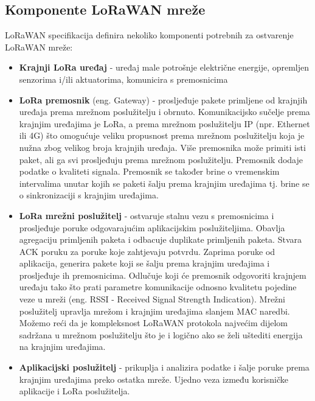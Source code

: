 \subsection{Komponente LoRaWAN mreže}
\label{subsection:lorawan_components}
LoRaWAN specifikacija definira nekoliko komponenti potrebnih za ostvarenje LoRaWAN mreže:
\begin{itemize}
\item \textbf{Krajnji LoRa uređaj} - uređaj male potrošnje električne energije, opremljen senzorima i/ili aktuatorima, komunicira s premosnicima

\item \textbf{LoRa premosnik} (eng. Gateway) - prosljeđuje pakete primljene od krajnjih uređaja prema mrežnom poslužitelju i obrnuto. Komunikacijsko sučelje prema krajnjim uređajima je LoRa, a prema mrežnom poslužitelju IP (npr. Ethernet ili 4G) što omogućuje veliku propusnost prema mrežnom poslužitelju koja je nužna zbog velikog broja krajnjih uređaja. Više premosnika može primiti isti paket, ali ga svi prosljeđuju prema mrežnom poslužitelju. Premosnik dodaje podatke o kvaliteti signala. Premosnik se također brine o vremenskim intervalima unutar kojih se paketi šalju prema krajnjim uređajima tj. brine se o sinkronizaciji s krajnjim uređajima.

\item \textbf{LoRa mrežni poslužitelj} - ostvaruje stalnu vezu s premosnicima i prosljeđuje poruke odgovarajućim aplikacijskim poslužiteljima. Obavlja agregaciju primljenih paketa i odbacuje duplikate primljenih paketa. Stvara ACK poruku za poruke koje zahtjevaju potvrdu. Zaprima poruke od aplikacija, generira pakete koji se šalju prema krajnjim uređajima i prosljeđuje ih premosnicima. Odlučuje koji će premosnik odgovoriti krajnjem uređaju tako što prati parametre komunikacije odnosno kvalitetu pojedine veze u mreži (eng. RSSI - Received Signal Strength Indication). Mrežni poslužitelj upravlja mrežom i krajnjim uređajima slanjem MAC naredbi. Možemo reći da je kompleksnost LoRaWAN protokola najvećim dijelom sadržana u mrežnom poslužitelju što je i logično ako se želi uštediti energija na krajnjim uređajima.

\item \textbf{Aplikacijski poslužitelj} - prikuplja i analizira podatke i šalje poruke prema krajnjim uređajima preko ostatka mreže. Ujedno veza između korisničke aplikacije i LoRa poslužitelja.
\end{itemize}

